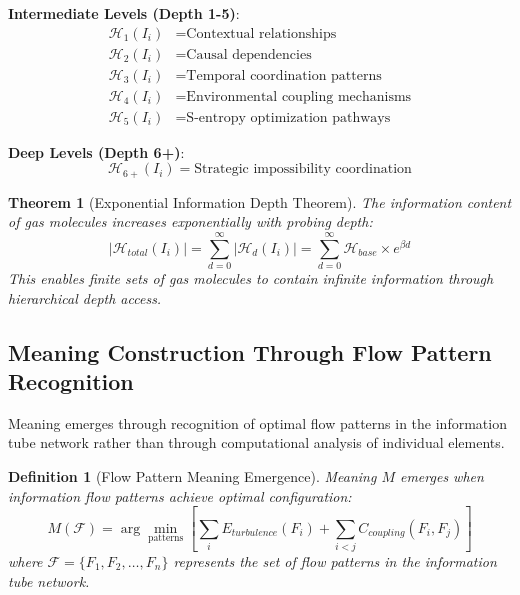 \documentclass[12pt,a4paper]{article}
\newtheorem{theorem}{Theorem}
\newtheorem{definition}{Definition}
\begin{document}
\textbf{Intermediate Levels (Depth 1-5)}:
\begin{align}
\mathcal{H}_1(I_i) &= \text{Contextual relationships} \\
\mathcal{H}_2(I_i) &= \text{Causal dependencies} \\
\mathcal{H}_3(I_i) &= \text{Temporal coordination patterns} \\
\mathcal{H}_4(I_i) &= \text{Environmental coupling mechanisms} \\
\mathcal{H}_5(I_i) &= \text{S-entropy optimization pathways}
\end{align}

\textbf{Deep Levels (Depth 6+)}:
\begin{equation}
\mathcal{H}_{6+}(I_i) = \text{Strategic impossibility coordination}
\end{equation}

\begin{theorem}[Exponential Information Depth Theorem]
The information content of gas molecules increases exponentially with probing depth:
\begin{equation}
|\mathcal{H}_{total}(I_i)| = \sum_{d=0}^{\infty} |\mathcal{H}_d(I_i)| = \sum_{d=0}^{\infty} \mathcal{H}_{base} \times e^{\beta d}
\end{equation}
This enables finite sets of gas molecules to contain infinite information through hierarchical depth access.
\end{theorem}

\subsection{Meaning Construction Through Flow Pattern Recognition}

Meaning emerges through recognition of optimal flow patterns in the information tube network rather than through computational analysis of individual elements.

\begin{definition}[Flow Pattern Meaning Emergence]
Meaning $M$ emerges when information flow patterns achieve optimal configuration:
\begin{equation}
M(\mathcal{F}) = \arg\min_{\text{patterns}} \left[\sum_{i} E_{turbulence}(F_i) + \sum_{i<j} C_{coupling}(F_i, F_j)\right]
\end{equation}
where $\mathcal{F} = \{F_1, F_2, \ldots, F_n\}$ represents the set of flow patterns in the information tube network.
\end{definition}
\end{document}
